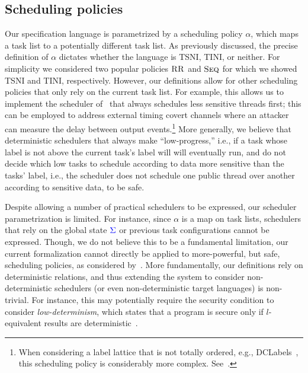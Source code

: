 \documentclass{sigplanconf}
\begin{document}
\subsection{Scheduling policies}
Our specification language is parametrized by a scheduling policy
\ensuremath{\alpha}, which maps a task list to a potentially different task list.
%
As previously discussed, the precise definition of \ensuremath{\alpha}
dictates whether the language is TSNI, TINI, or neither.
%
For simplicity we considered two popular policies \ensuremath{\textsc{RR}} and
\ensuremath{\textsc{Seq}} for which we showed TSNI and TINI, respectively.
%
However, our definitions allow for other scheduling policies that only
rely on the current task list.
%
For example, this allows us to implement the scheduler of~\cite{Kashyap:2011}
that always schedules less sensitive threads first; this can be
employed to address external timing covert channels where an attacker
can measure the delay between output events.\footnote{
  When considering a label lattice that is not totally ordered, e.g.,
  DCLabels~\cite{myers:dlm,dclabels}, this scheduling policy is
  considerably more complex. See~\cite{Kashyap:2011}.
}
%
More generally, we believe that deterministic schedulers that always
make ``low-progress,'' i.e., if a task whose label is not above the
current task's label will will eventually run, and do not decide which
low tasks to schedule according to data more sensitive than the tasks'
label, i.e., the scheduler does not schedule one public thread over
another according to sensitive data, to be safe.
%

Despite allowing a number of practical schedulers to be expressed, our
scheduler parametrization is limited.
%
For instance, since \ensuremath{\alpha} is a map on task lists, schedulers that
rely on the global state \ensuremath{\ifc{\Sigma}} or previous task configurations cannot
be expressed.
%
Though, we do not believe this to be a fundamental limitation, our
current formalization cannot directly be applied to more-powerful, but
safe, scheduling policies, as considered by~\cite{russo2006securing}.
%
More fundamentally, our definitions rely on deterministic relations,
and thus extending the system to consider non-deterministic schedulers
(or even non-deterministic target languages) is non-trivial.
%
For instance, this may potentially require the security condition to
consider \emph{low-determinism}, which states that a program is secure
only if \ensuremath{l}-equivalent results are deterministic~\cite{Zdancewic:Myers:CSFW03,
sabelfeld2003language}.
\end{document}
